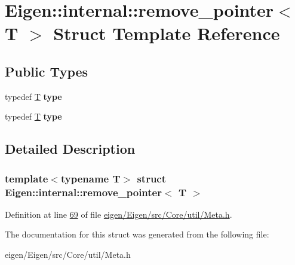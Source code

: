 \hypertarget{struct_eigen_1_1internal_1_1remove__pointer}{}\section{Eigen\+:\+:internal\+:\+:remove\+\_\+pointer$<$ T $>$ Struct Template Reference}
\label{struct_eigen_1_1internal_1_1remove__pointer}
\subsection*{Public Types}
\begin{DoxyCompactItemize}
\item 
\mbox{\label{struct_eigen_1_1internal_1_1remove__pointer_a28a02b4829fe9316ccfde57fdfe08e9c}} 
typedef \hyperlink{group___sparse_core___module}{T} {\bfseries type}
\item 
\mbox{\label{struct_eigen_1_1internal_1_1remove__pointer_a28a02b4829fe9316ccfde57fdfe08e9c}} 
typedef \hyperlink{group___sparse_core___module}{T} {\bfseries type}
\end{DoxyCompactItemize}


\subsection{Detailed Description}
\subsubsection*{template$<$typename T$>$\newline
struct Eigen\+::internal\+::remove\+\_\+pointer$<$ T $>$}



Definition at line \hyperlink{eigen_2_eigen_2src_2_core_2util_2_meta_8h_source_l00069}{69} of file \hyperlink{eigen_2_eigen_2src_2_core_2util_2_meta_8h_source}{eigen/\+Eigen/src/\+Core/util/\+Meta.\+h}.



The documentation for this struct was generated from the following file\+:\begin{DoxyCompactItemize}
\item 
eigen/\+Eigen/src/\+Core/util/\+Meta.\+h\end{DoxyCompactItemize}
